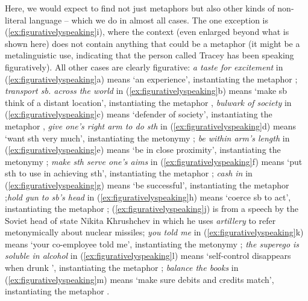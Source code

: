 Here, we would expect to find not just metaphors  but also other kinds of non\hyp{}literal language -- which we do in almost all cases. The one exception is (\ref{ex:figurativelyspeaking}i), where the context (even enlarged beyond what is shown here) does not contain anything that could be a metaphor  (it might be a metalinguistic use, indicating that the person called Tracey has been speaking figuratively). All other cases are clearly figurative:  \textit{a taste for excitement} in (\ref{ex:figurativelyspeaking}a) means `an experience', instantiating the metaphor ; \textit{transport sb. across the world} in (\ref{ex:figurativelyspeaking}b) means `make sb think of a distant location', instantiating the metaphor  , \textit{bulwark of society} in (\ref{ex:figurativelyspeaking}c) means `defender of society', instantiating the metaphor , \textit{give one's right arm to do sth} in (\ref{ex:figurativelyspeaking}d) means `want sth very much', instantiating the metonymy ; \textit{be within arm's length} in (\ref{ex:figurativelyspeaking}e) means `be in close proximity', instantiating the metonymy ; \textit{make sth serve one's aims} in (\ref{ex:figurativelyspeaking}f) means `put sth to use in achieving sth', instantiating the metaphor  ; \textit{cash in} in (\ref{ex:figurativelyspeaking}g) means `be successful', instantiating the metaphor ;\textit{hold gun to sb's head} in (\ref{ex:figurativelyspeaking}h) means `coerce sb to act', instantiating the metaphor  ; (\ref{ex:figurativelyspeaking}j) is from a speech by the Soviet head of state Nikita Khrushchev in which he uses \textit{artillery} to refer metonymically about nuclear missiles; \textit{you told me} in (\ref{ex:figurativelyspeaking}k) means `your co\hyp{}employee told me', instantiating the metonymy ; \textit{the superego is soluble in alcohol} in (\ref{ex:figurativelyspeaking}l) means `self\hyp{}control disappears when drunk ', instantiating the metaphor  ; \textit{balance the books} in (\ref{ex:figurativelyspeaking}m) means `make sure debits and credits match', instantiating the metaphor .


